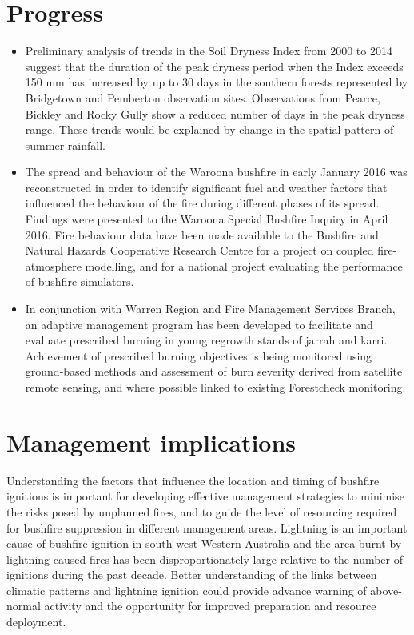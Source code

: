 \documentclass[version=last,
    paper=a4, %
    10pt, %
    usenames,
    dvipsnames,
    oneside, %
    headings=openany, %
    DIV=15 %
]{scrbook}
\begin{document}
\section*{Progress}
\begin{itemize}
\itemsep1pt\parskip0pt
\item
  Preliminary analysis of trends in the Soil Dryness Index from 2000 to
  2014 suggest that the duration of the peak dryness period when the
  Index exceeds 150 mm has increased by up to 30 days in the southern
  forests represented by Bridgetown and Pemberton observation sites.
  Observations from Pearce, Bickley and Rocky Gully show a reduced
  number of days in the peak dryness range. These trends would be
  explained by change in the spatial pattern of summer rainfall.
\item
  The spread and behaviour of the Waroona bushfire in early January 2016
  was reconstructed in order to identify significant fuel and weather
  factors that influenced the behaviour of the fire during different
  phases of its spread. Findings were presented to the Waroona Special
  Bushfire Inquiry in April 2016. Fire behaviour data have been made
  available to the Bushfire and Natural Hazards Cooperative Research
  Centre for a project on coupled fire-atmosphere modelling, and for a
  national project evaluating the performance of bushfire simulators.
\item
  In conjunction with Warren Region and Fire Management Services Branch,
  an adaptive management program has been developed to facilitate and
  evaluate prescribed burning in young regrowth stands of jarrah and
  karri. Achievement of prescribed burning objectives is being monitored
  using ground-based methods and assessment of burn severity derived
  from satellite remote sensing, and where possible linked to existing
  Forestcheck monitoring.
\end{itemize}



\section*{Management implications}
Understanding the factors that influence the location and timing of
bushfire ignitions is important for developing effective management
strategies to minimise the risks posed by unplanned fires, and to guide
the level of resourcing required for bushfire suppression in different
management areas. Lightning is an important cause of bushfire ignition
in south-west Western Australia and the area burnt by lightning-caused
fires has been disproportionately large relative to the number of
ignitions during the past decade. Better understanding of the links
between climatic patterns and lightning ignition could provide advance
warning of above-normal activity and the opportunity for improved
preparation and resource deployment.
\end{document}
